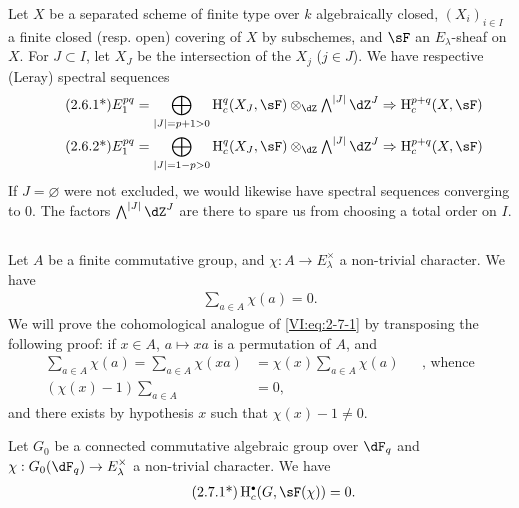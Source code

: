 Let $X$ be a separated scheme of finite type over $k$ algebraically closed,
$(X_i)_{i\in I}$ a finite closed (resp. open) covering of $X$ by
subschemes, and $\sF$ an $E_\lambda$-sheaf on $X$. For $J\subset I$,
let $X_J$ be the intersection of the $X_j$ ($j\in J$). We have respective
(Leray) spectral sequences 
\begin{align*}\tag{2.6.1*}\label{VI:eq:2-6-1*}
  E_1^{p q} &= \bigoplus_{|J|=p+1>0} \h_c^q(X_J,\sF) \otimes_\dZ \textstyle\bigwedge^{|J|} \dZ^J \Rightarrow \h_c^{p+q}(X,\sF) \\ 
  \tag{2.6.2*}\label{VI:eq:2-6-2*}
  E_1^{p q} &= \bigoplus_{|J|=1-p>0} \h_c^q(X_J,\sF) \otimes_\dZ \textstyle\bigwedge^{|J|} \dZ^J \Rightarrow \h_c^{p+q}(X,\sF)
\end{align*}
If $J=\varnothing$ were not excluded, we would likewise have
spectral sequences converging to $0$. The factors $\bigwedge^{|J|} \dZ^J$ are there
to spare us from choosing a total order on $I$. 





\subsection{}\label{VI:2-7}

Let $A$ be a finite commutative group, and $\chi:A \to E_\lambda^\times$ a
non-trivial character. We have 
\begin{align*}\tag{2.7.1}\label{VI:eq:2-7-1}
  \sum_{a\in A} \chi(a) = 0 \text{.}
\end{align*}
We will prove the cohomological analogue of \eqref{VI:eq:2-7-1} by transposing
the following proof: if $x\in A$, $a\mapsto x a$ is a permutation of $A$, and 
\begin{align*}
  \sum_{a\in A}\chi(a) = \sum_{a\in A} \chi(x a) &= \chi(x) \sum_{a\in A} \chi(a) && \text{, whence} \\
  (\chi(x)-1)\sum_{a\in A} &= 0 \text{,}
\end{align*}
and there exists by hypothesis $x$ such that $\chi(x)-1\ne 0$. 





\begin{theorem*}[2.7*]\label{VI:2-7*}
Let $G_0$ be a connected commutative algebraic group over $\dF_q$ and
$\chi:G_0(\dF_q) \to E_\lambda^\times$ a non-trivial character. We have 
\begin{align*}\tag{2.7.1*}\label{VI:eq:2-7-1*}
  \h_c^\bullet(G,\sF(\chi)) = 0 \text{.}
\end{align*}
\end{theorem*}


